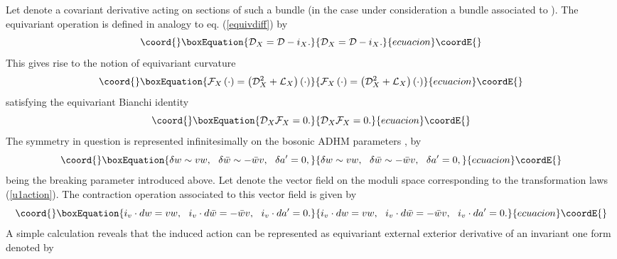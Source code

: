 \documentclass[a4paper,12pt]{article}
\begin{document}
Let \coordHE{} denote a covariant derivative acting on 
sections of such a bundle (in the case under consideration a bundle 
associated to \coordHE{}). The equivariant operation \coordHE{} is 
defined in analogy to eq. (\ref{equivdiff}) by 
\begin{equation}\coord{}\boxEquation{
{\cal D}_X ={\cal D}-i_X
\label{covequivdiff}.
}{
{\cal D}_X ={\cal D}-i_X
.
}{ecuacion}\coordE{}\end{equation} 
This gives rise to the notion of equivariant curvature 
\begin{equation}\coord{}\boxEquation{
{\cal F}_X\left(\cdot \right) =\left({\cal D}_X^2 +{\cal L}_X \right)
\left(\cdot \right)
\label{equivcurvature}
}{
{\cal F}_X\left(\cdot \right) =\left({\cal D}_X^2 +{\cal L}_X \right)
\left(\cdot \right)
}{ecuacion}\coordE{}\end{equation} 
satisfying the equivariant Bianchi identity
\begin{equation}\coord{}\boxEquation{
{\cal D}_X {\cal F}_X=0
\label{equivbianchi}. 
}{
{\cal D}_X {\cal F}_X=0
. 
}{ecuacion}\coordE{}\end{equation}
The \coordHE{} symmetry in question is represented infinitesimally 
on the bosonic ADHM parameters \coordHE{}, \coordHE{} by   
\begin{equation}\coord{}\boxEquation{
\delta w\sim vw, \, \, \, \, \delta \bar{w}\sim -\bar{w} v , 
\, \, \, \, \delta a'=0, 
\label{u1action} 
}{
\delta w\sim vw, \, \, \, \, \delta \bar{w}\sim -\bar{w} v , 
\, \, \, \, \delta a'=0, 
}{ecuacion}\coordE{}\end{equation}  
\coordHE{} being the breaking parameter introduced above. Let \coordHE{} denote 
the vector field on the moduli space corresponding to the 
transformation laws (\ref{u1action}). The contraction operation 
associated to this vector field is given by
\begin{equation}\coord{}\boxEquation{
i_v \cdot d w = vw, \, \, \, \, i_v \cdot d \bar{w} = -\bar{w} v , 
\, \, \, \, i_v \cdot d a'=0. 
\label{contraction} 
}{
i_v \cdot d w = vw, \, \, \, \, i_v \cdot d \bar{w} = -\bar{w} v , 
\, \, \, \, i_v \cdot d a'=0. 
}{ecuacion}\coordE{}\end{equation}    
A simple calculation reveals that the induced action \coordHE{} can 
be represented as equivariant external exterior derivative of 
an \coordHE{} invariant one form denoted by \myHighlight{$\omega$}\coordHE{} 
\end{document}
